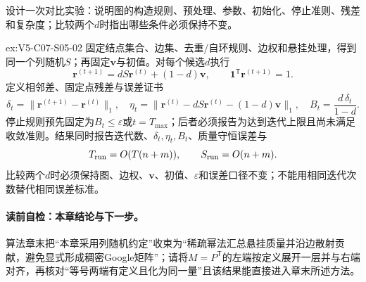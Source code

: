 \begin{SLChapterExercisePairSection}
\begin{exercise}\label{ex:V5-C07-S05-02}
设计一次\PageRank{}对比实验：说明图的构造规则、预处理、参数、初始化、停止准则、残差和复杂度；比较两个$d$时指出哪些条件必须保持不变。
\end{exercise}
\ifSLFullEdition
{}\label{sol:V5-C07-S05-02}
\begin{chapterexercisesolution}{ex:V5-C07-S05-02}
固定结点集合、边集、去重/自环规则、边权和悬挂处理，得到同一个列随机$S$；再固定$\boldsymbol v$与初值。对每个候选$d$执行
\[
\boldsymbol r^{(t+1)}
=dS\boldsymbol r^{(t)}+(1-d)\boldsymbol v,
\qquad \boldsymbol1^{\mathsf T}\boldsymbol r^{(t+1)}=1.
\]
定义相邻差、固定点残差与误差证书
\[
\delta_t=\|\boldsymbol r^{(t+1)}-\boldsymbol r^{(t)}\|_1,\quad
\eta_t=\|\boldsymbol r^{(t)}-dS\boldsymbol r^{(t)}-(1-d)\boldsymbol v\|_1,
\quad B_t=\frac{d\,\delta_t}{1-d}.
\]
停止规则预先固定为$B_t\le\varepsilon$或$t=T_{\max}$；后者必须报告为达到迭代上限且尚未满足收敛准则。结果同时报告迭代数、$\delta_t,\eta_t,B_t$、质量守恒误差与
\[
T_{\rm run}=O(T(n+m)),\qquad S_{\rm run}=O(n+m).
\]
比较两个$d$时必须保持图、边权、$\boldsymbol v$、初值、$\varepsilon$和误差口径不变；不能用相同迭代次数替代相同误差标准。
\end{chapterexercisesolution}
\fi

\end{SLChapterExercisePairSection}

\begingroup
{}
\setlength{\parskip}{0pt}
\paragraph{读前自检：本章结论与下一步。}\PageRank{} 算法章末把“本章采用列随机约定”收束为“稀疏幂法汇总悬挂质量并沿边散射贡献，避免显式形成稠密Google矩阵”；请将$M=P^{\mathsf T}$的左端按定义展开一层并与右端对齐，再核对“等号两端有定义且化为同一量”且该结果能直接进入章末所述方法。\par

